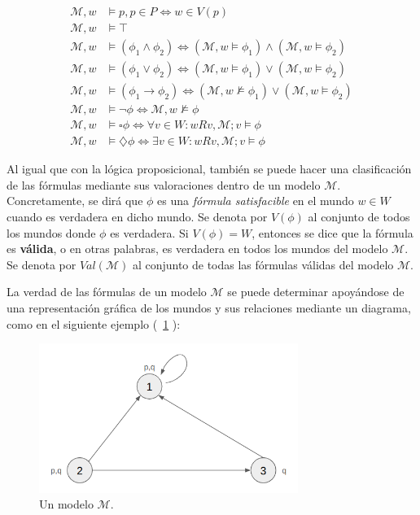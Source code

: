 \begin{align*}
    \mathcal{M},w &\models p, p \in P \Leftrightarrow w \in V(p) \\
    \mathcal{M},w &\models \top \\
    \mathcal{M},w &\models (\phi_1 \land \phi_2) \Leftrightarrow (\mathcal{M},w \models \phi_1) \land (\mathcal{M},w \models \phi_2)  \\
    \mathcal{M},w &\models (\phi_1 \lor \phi_2) \Leftrightarrow (\mathcal{M},w \models \phi_1) \lor (\mathcal{M},w \models \phi_2)\\
    \mathcal{M},w &\models (\phi_1 \rightarrow \phi_2) \Leftrightarrow (\mathcal{M},w \not \models \phi_1) \lor (\mathcal{M},w \models \phi_2) \\
    \mathcal{M},w &\models \neg \phi \Leftrightarrow \mathcal{M},w \not \models \phi \\
    \mathcal{M},w &\models \square \phi \Leftrightarrow \forall v \in W : wRv, \mathcal{M}; v \models \phi\\
    \mathcal{M},w &\models \diamondsuit \phi \Leftrightarrow \exists v \in W : wRv, \mathcal{M}; v \models \phi
\end{align*}

Al igual que con la lógica proposicional, también se puede hacer una clasificación de las fórmulas mediante sus valoraciones dentro de un modelo $\mathcal{M}$. Concretamente, se dirá que $\phi$ es una \textit{fórmula satisfacible} en el mundo $w \in W$ cuando es verdadera en dicho mundo. Se denota por $V(\phi)$ al conjunto de todos los mundos donde $\phi$ es verdadera. Si $V(\phi) = W$, entonces se dice que la fórmula es \textbf{válida}, o en otras palabras, es verdadera en todos los mundos del modelo $\mathcal{M}$. Se denota por $Val(\mathcal{M})$ al conjunto de todas las fórmulas válidas del modelo $\mathcal{M}$.

La verdad de las fórmulas de un modelo $\mathcal{M}$ se puede determinar apoyándose de una representación gráfica de los mundos y sus relaciones mediante un diagrama, como en el siguiente ejemplo (~\ref{fig:lmodalimg1} ):

\begin{figure}[h]
    \centering
    \includegraphics[width=0.75\textwidth]{images/maths/lmodal1.png}
    \caption{Un modelo $\mathcal{M}$.}
    \label{fig:lmodalimg1}
\end{figure}

